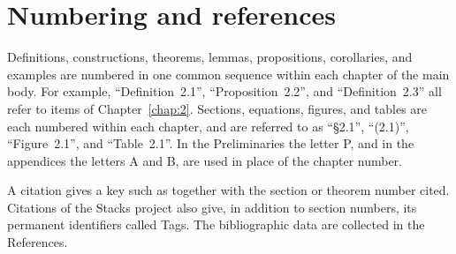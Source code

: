 \section{Numbering and references}\label{sec:P.5}

Definitions, constructions, theorems, lemmas, propositions, corollaries, and
examples are numbered in one common sequence within each chapter of the main
body. For example, ``Definition~2.1'', ``Proposition~2.2'', and
``Definition~2.3'' all refer to items of Chapter~\ref{chap:2}. Sections, equations,
figures, and tables are each numbered within each chapter, and are referred to
as ``\S2.1'', ``(2.1)'', ``Figure~2.1'', and ``Table~2.1''. In the
Preliminaries the letter P, and in the appendices the letters A and B, are
used in place of the chapter number.

A citation gives a key such as \cite{Stacks}
together with the section or theorem number cited. Citations of the Stacks
project also give, in addition to section numbers, its permanent identifiers
called Tags. The bibliographic data are collected in the References.
